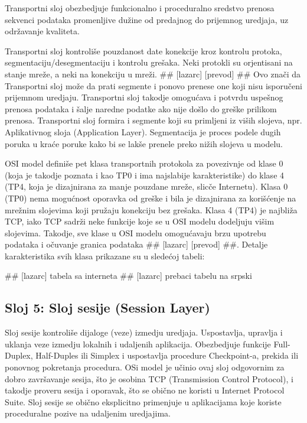 \documentclass[a4paper,12pt, master]{etf}
\begin{document}
	Transportni sloj obezbedjuje funkcionalno i proceduralno sredstvo prenosa sekvenci podataka
	promenljive du\v{z}ine od predajnog do prijemnog uredjaja, uz odr\v{z}avanje kvaliteta.

	Transportni sloj kontroli\v{s}e pouzdanost date konekcije kroz kontrolu protoka,
	segmentaciju/desegmentaciju i kontrolu gre\v{s}aka. Neki protokli su orjentisani na stanje
	mre\v{z}e, a neki na konekciju u mre\v{z}i. \#\# [lazarc] [prevod] \#\# Ovo zna\v{c}i da Transportni
	sloj mo\v{z}e da prati segmente i ponovo prenese one koji nisu isporu\v{c}eni prijemnom uredjaju.
	Transportni sloj takodje omogu\'{c}ava i potvrdu uspe\v{s}nog prenosa podataka i \v{s}alje naredne
	podatke ako nije do\v{s}lo do gre\v{s}ke prilikom prenosa. Transportni sloj formira i segmente
	koji su primljeni iz vi\v{s}ih slojeva, npr. Aplikativnog sloja (Application Layer).
	Segmentacija je proces podele dugih poruka u kra\'{c}e poruke kako bi se lak\v{s}e prenele preko
	ni\v{z}ih slojeva u modelu.

	OSI model defini\v{s}e pet klasa transportnih protokola za povezivnje od klase 0 (koja je
	takodje poznata i kao TP0 i ima najslabije karakteristike) do klase 4 (TP4, koja je
	dizajnirana za manje pouzdane mre\v{z}e, slic\v{c}e Internetu). Klasa 0 (TP0) nema mogu\'{c}nost
	oporavka od gre\v{s}ke i bila je dizajnirana za kori\v{s}\'{c}enje na mre\v{z}nim slojevima koji pru\v{z}aju
	konekciju bez gre\v{s}aka. Klasa 4 (TP4) je najbli\v{z}a TCP, iako TCP sadr\v{z}i neke funkcije koje
	se u OSI modelu dodeljuju vi\v{s}im slojevima. Takodje, sve klase u OSI modelu omogu\'{c}avaju
	brzu upotrebu podataka i o\v{c}uvanje granica podataka \#\# [lazarc] [prevod] \#\#. Detalje
	karakteristika svih klasa prikazane su u slede\'{c}oj tabeli:

	\#\# [lazarc] tabela sa interneta
	\#\# [lazarc] prebaci tabelu na srpski

	\subsection{Sloj 5: Sloj sesije (Session Layer)}

	Sloj sesije kontroli\v{s}e dijaloge (veze) izmedju uredjaja. Uspostavlja, upravlja i uklanja
	veze izmedju lokalnih i udaljenih aplikacija. Obezbedjuje funkcije Full-Duplex,
	Half-Duples ili	Simplex i uspostavlja procedure Checkpoint-a, prekida ili ponovnog
	pokretanja procedura. OSi model je u\v{c}inio ovaj sloj odgovornim za dobro zavr\v{s}avanje sesija,
	\v{s}to je osobina TCP (Transmission Control Protocol), i takodje proveru sesija i oporavak,
	\v{s}to se obi\v{c}no ne koristi u Internet Protocol Suite. Sloj sesije se obi\v{c}no eksplicitno
	primenjuje u aplikacijama koje koriste proceduralne pozive na udaljenim uredjajima.
\end{document}
